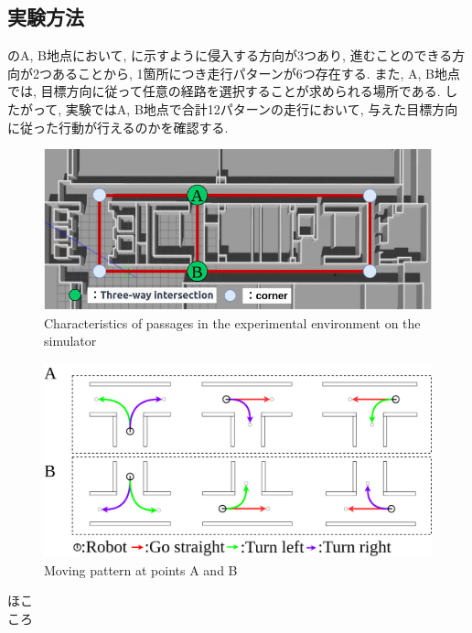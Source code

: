\subsection{実験方法}
のA, B地点において, に示すように侵入する方向が3つあり, 進むことのできる方向が2つあることから, 1箇所につき走行パターンが6つ存在する. 
また, A, B地点では, 目標方向に従って任意の経路を選択することが求められる場所である.
したがって, 実験ではA, B地点で合計12パターンの走行において, 与えた目標方向に従った行動が行えるのかを確認する.

\begin{figure}[hbtp]
  \centering
 \includegraphics[keepaspectratio, scale=0.5]
      {images/sim_explain.png}
 \caption{Characteristics of passages in the experimental environment on the simulator}
 \label{Fig:sim_explain}
\end{figure}

\begin{figure}[hbtp]
  \centering
 \includegraphics[keepaspectratio, scale=0.15]
      {images/select.png}
 \caption{Moving pattern at points A and B}
 \label{Fig:select}
\end{figure}

ほこ\\
ころ

